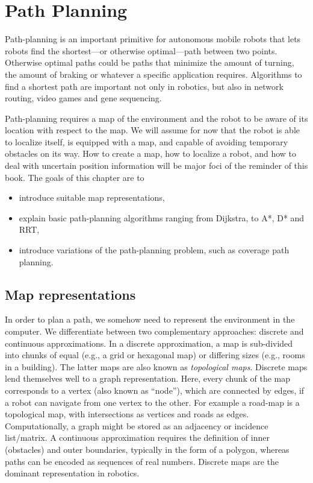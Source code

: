 \chapter{Path Planning}\label{chap:pathplanning}
Path-planning is an important primitive for autonomous mobile robots that lets robots find the shortest---or otherwise optimal---path between two points. Otherwise optimal paths could be paths that minimize the amount of turning, the amount of braking or whatever a specific application requires. Algorithms to find a shortest path are important not only in robotics, but also in network routing, video games and gene sequencing.

Path-planning requires a map of the environment and the robot to be aware of its location with respect to the map. We will assume for now that the robot is able to localize itself,  is equipped with a map, and capable of avoiding temporary obstacles on its way. How to create a map, how to localize a robot, and how to deal with uncertain position information will be major foci of the reminder of this  book. The goals of this chapter are to

\begin{itemize}
\item introduce suitable map representations,
\item explain basic path-planning algorithms  ranging from Dijkstra, to A*, D* and RRT,
\item introduce variations of the path-planning problem, such as coverage path planning.
\end{itemize}

\section{Map representations}
In order to plan a path, we somehow need to represent the environment in the computer. We differentiate between two complementary approaches: discrete and continuous approximations. In a discrete approximation, a map is sub-divided into chunks of equal (e.g., a grid or hexagonal map) or differing sizes (e.g., rooms in a building). The latter maps are also known as \emph{topological maps}. Discrete maps lend themselves well to a graph representation. Here, every chunk of the map corresponds to a vertex (also known as ``node''), which are connected by edges, if a robot can navigate from one vertex to the other. For example a road-map is a topological map, with intersections as vertices and roads as edges. Computationally, a graph might be stored as an adjacency or incidence list/matrix. A continuous approximation requires the definition of inner (obstacles) and outer boundaries, typically in the form of a polygon, whereas paths can be encoded as sequences of real numbers. Discrete maps are the dominant representation in robotics.

